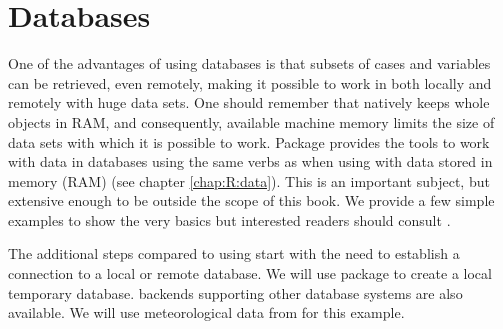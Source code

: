 \documentclass[krantz2]{krantz}\usepackage{knitr}
\begin{document}
\section{Databases}\label{sec:data:db}




One of the advantages of using databases is that subsets of cases and variables can be retrieved, even remotely, making it possible to work in \Rlang both locally and remotely with huge data sets. One should remember that \Rlang natively keeps whole objects in RAM, and consequently, available machine memory limits the size of data sets with which it is possible to work. Package  provides the tools to work with data in databases using the same verbs as when using  with data stored in memory (RAM) (see chapter \ref{chap:R:data}). This is an important subject, but extensive enough to be outside the scope of this book. We provide a few simple examples to show the very basics but interested readers should consult  \autocite{Wickham2017}.

The additional steps compared to using  start with the need to establish a connection to a local or remote database. We will use \Rlang package  to create a local temporary  database.  backends supporting other database systems are also available. We will use meteorological data from  for this example.
\end{document}
